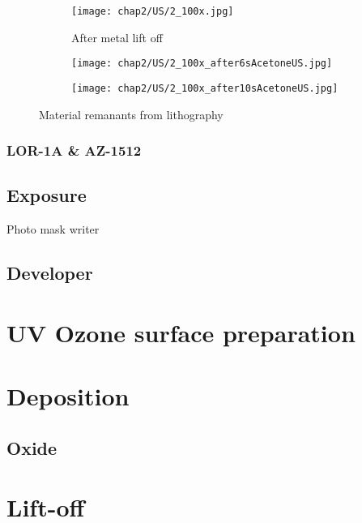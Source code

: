 \documentclass[../Matt_Gebert_Honours_Thesis.tex]{subfiles}
\begin{document}
	
	\begin{figure}[H]
		\centering
		\begin{subfigure}[b]{0.3\textwidth}
			\texttt{[image: chap2/US/2\_100x.jpg]}
			\caption{After metal lift off}			
		\end{subfigure}
		\begin{subfigure}[b]{0.3\textwidth}
			\texttt{[image: chap2/US/2\_100x\_after6sAcetoneUS.jpg]}
		\end{subfigure}
		\begin{subfigure}[b]{0.3\textwidth}
			\texttt{[image: chap2/US/2\_100x\_after10sAcetoneUS.jpg]}
		\end{subfigure}
		\caption{Material remanants from lithography}\label{fig:lithography_skins_us}
	\end{figure}
	
	\subsubsection{LOR-1A \& AZ-1512}
	
	\subsection{Exposure}\label{sec:exposure}
		Photo mask writer
	
	\subsection{Developer}\label{sec:developer}
	
	\section{UV Ozone surface preparation}\label{sec:uv_ozone}
	
	\section{Deposition}\label{sec:deposition}
	
	\subsection{Oxide}
	
	\section{Lift-off}\label{}
\end{document}
